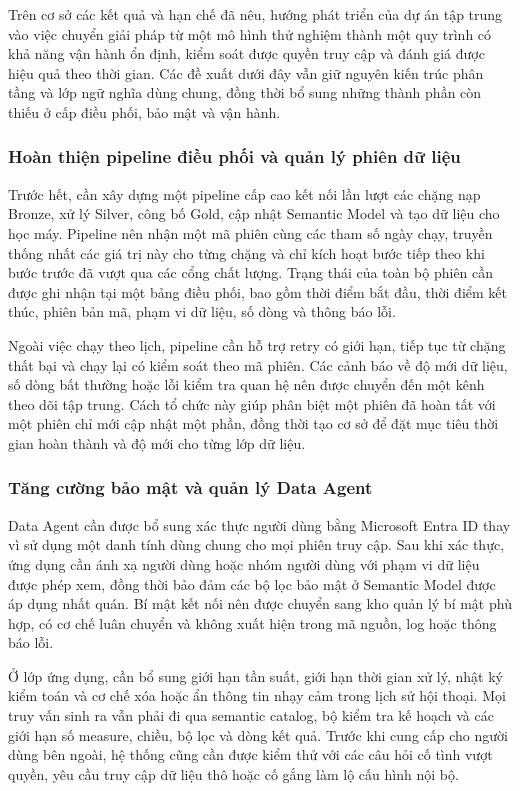 Trên cơ sở các kết quả và hạn chế đã nêu, hướng phát triển của dự án tập trung vào việc chuyển giải pháp từ một mô hình thử nghiệm thành một quy trình có khả năng vận hành ổn định, kiểm soát được quyền truy cập và đánh giá được hiệu quả theo thời gian. Các đề xuất dưới đây vẫn giữ nguyên kiến trúc phân tầng và lớp ngữ nghĩa dùng chung, đồng thời bổ sung những thành phần còn thiếu ở cấp điều phối, bảo mật và vận hành.

\subsubsection{Hoàn thiện pipeline điều phối và quản lý phiên dữ liệu}

Trước hết, cần xây dựng một pipeline cấp cao kết nối lần lượt các chặng nạp Bronze, xử lý Silver, công bố Gold, cập nhật Semantic Model và tạo dữ liệu cho học máy. Pipeline nên nhận một mã phiên cùng các tham số ngày chạy, truyền thống nhất các giá trị này cho từng chặng và chỉ kích hoạt bước tiếp theo khi bước trước đã vượt qua các cổng chất lượng. Trạng thái của toàn bộ phiên cần được ghi nhận tại một bảng điều phối, bao gồm thời điểm bắt đầu, thời điểm kết thúc, phiên bản mã, phạm vi dữ liệu, số dòng và thông báo lỗi.

Ngoài việc chạy theo lịch, pipeline cần hỗ trợ retry có giới hạn, tiếp tục từ chặng thất bại và chạy lại có kiểm soát theo mã phiên. Các cảnh báo về độ mới dữ liệu, số dòng bất thường hoặc lỗi kiểm tra quan hệ nên được chuyển đến một kênh theo dõi tập trung. Cách tổ chức này giúp phân biệt một phiên đã hoàn tất với một phiên chỉ mới cập nhật một phần, đồng thời tạo cơ sở để đặt mục tiêu thời gian hoàn thành và độ mới cho từng lớp dữ liệu.

\subsubsection{Tăng cường bảo mật và quản lý Data Agent}

Data Agent cần được bổ sung xác thực người dùng bằng Microsoft Entra ID thay vì sử dụng một danh tính dùng chung cho mọi phiên truy cập. Sau khi xác thực, ứng dụng cần ánh xạ người dùng hoặc nhóm người dùng với phạm vi dữ liệu được phép xem, đồng thời bảo đảm các bộ lọc bảo mật ở Semantic Model được áp dụng nhất quán. Bí mật kết nối nên được chuyển sang kho quản lý bí mật phù hợp, có cơ chế luân chuyển và không xuất hiện trong mã nguồn, log hoặc thông báo lỗi.

Ở lớp ứng dụng, cần bổ sung giới hạn tần suất, giới hạn thời gian xử lý, nhật ký kiểm toán và cơ chế xóa hoặc ẩn thông tin nhạy cảm trong lịch sử hội thoại. Mọi truy vấn sinh ra vẫn phải đi qua semantic catalog, bộ kiểm tra kế hoạch và các giới hạn số measure, chiều, bộ lọc và dòng kết quả. Trước khi cung cấp cho người dùng bên ngoài, hệ thống cũng cần được kiểm thử với các câu hỏi cố tình vượt quyền, yêu cầu truy cập dữ liệu thô hoặc cố gắng làm lộ cấu hình nội bộ.

